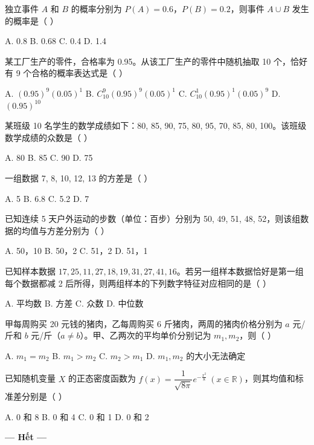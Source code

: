 \documentclass[11pt, a4paper]{article}
\begin{document}
\begin{baitap}[41]
独立事件 $A$ 和 $B$ 的概率分别为 $P(A) = 0.6$，$P(B) = 0.2$，则事件 $A \cup B$ 发生的概率是（ ）
\par\vspace{3pt}
\noindent A. 0.8 \quad B. 0.68 \quad C. 0.4 \quad D. 1.4
\end{baitap}

\begin{baitap}[42]
某工厂生产的零件，合格率为 0.95。从该工厂生产的零件中随机抽取 10 个，恰好有 9 个合格的概率表达式是（ ）
\par\vspace{3pt}
\noindent A. $(0.95)^9 (0.05)^1$ \quad B. $C_{10}^9 (0.95)^9 (0.05)^1$ \quad C. $C_{10}^1 (0.95)^1 (0.05)^9$ \quad D. $(0.95)^{10}$
\end{baitap}

\begin{baitap}[43]
某班级 10 名学生的数学成绩如下：80, 85, 90, 75, 80, 95, 70, 85, 80, 100。该班级数学成绩的众数是（ ）
\par\vspace{3pt}
\noindent A. 80 \quad B. 85 \quad C. 90 \quad D. 75
\end{baitap}

\begin{baitap}[44]
一组数据 7, 8, 10, 12, 13 的方差是（ ）
\par\vspace{3pt}
\noindent A. 5 \quad B. 6.8 \quad C. 5.2 \quad D. 7
\end{baitap}

\begin{baitap}[45]
已知连续 5 天户外运动的步数（单位：百步）分别为 50, 49, 51, 48, 52，则该组数据的均值与方差分别为（ ）
\par\vspace{3pt}
\noindent A. 50，10 \quad B. 50，2 \quad C. 51，2 \quad D. 51，1
\end{baitap}

\begin{baitap}[46]
已知样本数据 $17, 25, 11, 27, 18, 19, 31, 27, 41, 16$。若另一组样本数据恰好是第一组每个数据都减 2 后所得，则两组样本的下列数字特征对应相同的是（ ）
\par\vspace{3pt}
\noindent A. 平均数 \quad B. 方差 \quad C. 众数 \quad D. 中位数
\end{baitap}

\begin{baitap}[47]
甲每周购买 20 元钱的猪肉，乙每周购买 6 斤猪肉，两周的猪肉价格分别为 $a$ 元/斤和 $b$ 元/斤（$a \ne b$）。甲、乙两次的平均单价分别记为 $m_1, m_2$，则（ ）
\par\vspace{3pt}
\noindent A. $m_1 = m_2$ \quad B. $m_1 > m_2$ \quad C. $m_2 > m_1$ \quad D. $m_1, m_2$ 的大小无法确定
\end{baitap}

\begin{baitap}[48]
已知随机变量 $X$ 的正态密度函数为 $f(x) = \dfrac{1}{\sqrt{8\pi}} e^{-\frac{x^2}{8}}\ (x \in \mathbb{R})$，则其均值和标准差分别是（ ）
\par\vspace{3pt}
\noindent A. 0 和 8 \quad B. 0 和 4 \quad C. 0 和 1 \quad D. 0 和 2
\end{baitap}

\vspace{0.5cm}
\begin{center}
\textbf{--- Hết ---}
\end{center}
\end{document}
